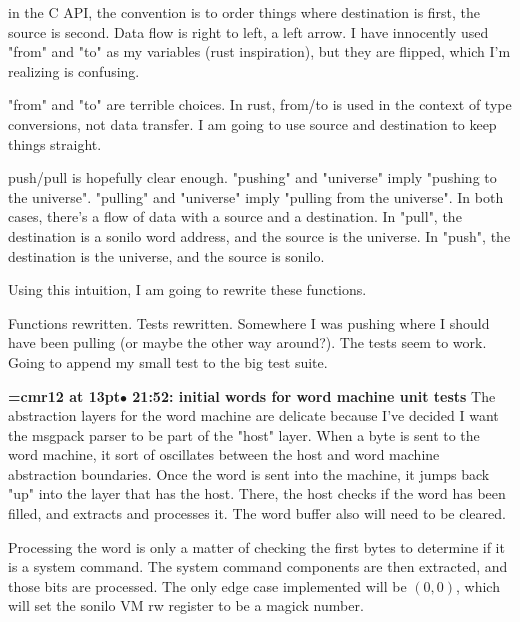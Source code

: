 in the C API, the convention is to order things where destination is first, the source is second. Data flow is right to left, a left arrow. I have innocently used "from" and "to" as my variables (rust inspiration), but they are flipped, which I'm realizing is confusing.
\par

"from" and "to" are terrible choices. In rust, from/to is used in the context of type conversions, not data transfer. I am going to use source and destination to keep things straight.
\par

push/pull is hopefully clear enough. "pushing" and "universe" imply "pushing to the universe". "pulling" and "universe" imply "pulling from the universe". In both cases, there's a flow of data with a source and a destination. In "pull", the destination is a sonilo word address, and the source is the universe. In "push", the destination is the universe, and the source is sonilo.
\par

Using this intuition, I am going to rewrite these functions.
\par

Functions rewritten. Tests rewritten. Somewhere I was pushing where I should have been pulling (or maybe the other way around?). The tests seem to work. Going to append my small test to the big test suite.
\par

{\smallskip\noindent\bf\font\titlefont=cmr12 at 13pt\titlefont $\bullet$ 21:52: initial words for word machine unit tests}\smallskip
The abstraction layers for the word machine are delicate because I've decided I want the msgpack parser to be part of the "host" layer. When a byte is sent to the word machine, it sort of oscillates between the host and word machine abstraction boundaries. Once the word is sent into the machine, it jumps back "up" into the layer that has the host. There, the host checks if the word has been filled, and extracts and processes it. The word buffer also will need to be cleared.
\par

Processing the word is only a matter of checking the first bytes to determine if it is a system command. The system command components are then extracted, and those bits are processed. The only edge case implemented will be $(0, 0)$, which will set the sonilo VM rw register to be a magick number.
\par

